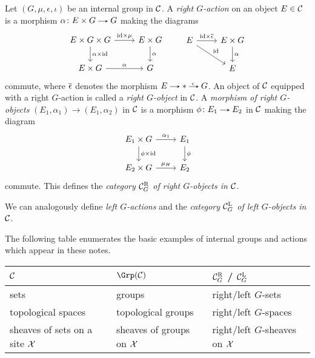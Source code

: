 \begin{appendices}
  \renewcommand{\R}{\mathrm{R}}
  \renewcommand{\L}{\mathrm{L}}
  \begin{definitions}
    Let $(G,\mu,\epsilon,\iota)$ be an internal group in $\mathcal{C}$. A
    \emph{right $G$-action} on an object $E \in \mathcal{C}$ is a morphism
    $\alpha \c E \times G \to G$ making the diagrams
    \[
    \begin{tikzcd}
      E \times G \times G \ar[r, "\id \times \mu"] \ar[d, "\alpha
      \times \id"] & E \times G \ar[d, "\alpha"] \\ E \times G \ar[r,
      "\alpha"] & G
    \end{tikzcd}
    \qquad
    \begin{tikzcd}
      E \ar[r, "\id \times \o\epsilon"] \ar[dr, "\id"] & E \times G
      \ar[d, "\alpha"] \\ & E
    \end{tikzcd}
    \]
    commute, where $\overline\epsilon$ denotes the morphism $E \to *
    \lblto{\epsilon} G$. An object of $\mathcal{C}$ equipped with a right
    $G$-action is called a \emph{right $G$-object} in $\mathcal{C}$. A
    \emph{morphism of right $G$-objects} $(E_1,\alpha_1) \to
    (E_1,\alpha_2)$ in $\mathcal{C}$ is a morphism $\phi \c E_1 \to E_2$ in
    $\mathcal{C}$ making the diagram
    \[
    \begin{tikzcd}
      E_1 \times G \ar[r, "\alpha_1"] \ar[d, "\phi \times \id"] & E_1
      \ar[d, "\phi"] \\ E_2 \times G \ar[r, "\mu_H"] & E_2
    \end{tikzcd}
    \]
    commute. This defines the \emph{category $\C_G^\R$ of right
      $G$-objects in $\mathcal{C}$}.

    We can analogously define \emph{left $G$-actions} and the
    \emph{category $\C_G^\L$ of left $G$-objects in $\mathcal{C}$}.
  \end{definitions}

  \begin{examples}
    The following table enumerates the basic examples of internal
    groups and actions which appear in these notes.

    \begin{table}[h]
      \begin{tabular}{|p{90pt}|p{90pt}|p{90pt}|}
        \hline
        $\mathcal{C}$ & $\Grp(\C)$ & $\C_G^\R$ / $\C_G^\L$ \\
        \hline
        sets & groups & right/left $G$-sets \\[5pt]
        topological spaces & topological groups & right/left
        $G$-spaces \\[5pt]
        sheaves of sets on a site $\mathcal{X}$ & sheaves of groups on $\mathcal{X}$ &
        right/left $G$-sheaves on $\mathcal{X}$ \\
        \hline
      \end{tabular}
    \end{table}
  \end{examples}


\end{appendices}
